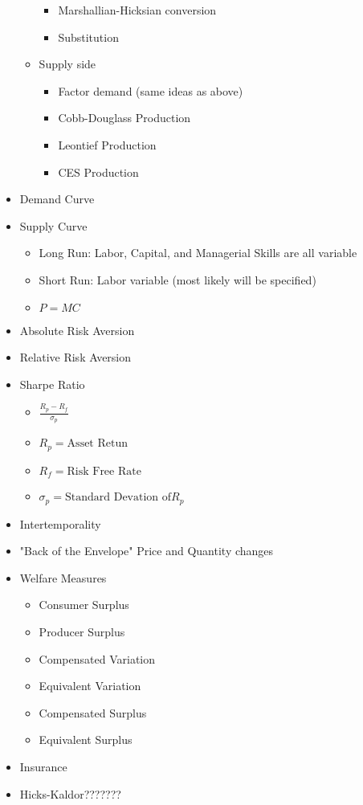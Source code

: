 \begin{itemize}
\begin{itemize}
\begin{itemize}
\begin{itemize}
			\end{itemize}
			\item Marshallian-Hicksian conversion
			\item Substitution
		\end{itemize}
		\item Supply side
		\begin{itemize}
			\item Factor demand (same ideas as above)
			\item Cobb-Douglass Production
			\item Leontief Production
			\item CES Production
		\end{itemize}
	\end{itemize}
	\item Demand Curve
	\item Supply Curve
	\begin{itemize}
	\item Long Run: Labor, Capital, and Managerial Skills are all variable
	\item Short Run: Labor variable (most likely will be specified)		
	\item $P = MC$
	\end{itemize}
	\item Absolute Risk Aversion
	\item Relative Risk Aversion
	\item Sharpe Ratio
	\begin{itemize}
		\item $\frac{R_p - R_f}{\sigma_p}$
		\item $R_p = \text{Asset Retun}$
		\item $R_f = \text{Risk Free Rate}$
		\item $\sigma_p = \text{Standard Devation of} R_p$
	\end{itemize}
	\item Intertemporality
	\item "Back of the Envelope" Price and Quantity changes
	\item Welfare Measures
	\begin{itemize}
		\item Consumer Surplus
		\item Producer Surplus
		\item Compensated Variation
		\item Equivalent Variation
		\item Compensated Surplus
		\item Equivalent Surplus
	\end{itemize}
	\item Insurance
	\item Hicks-Kaldor???????
\end{itemize}
